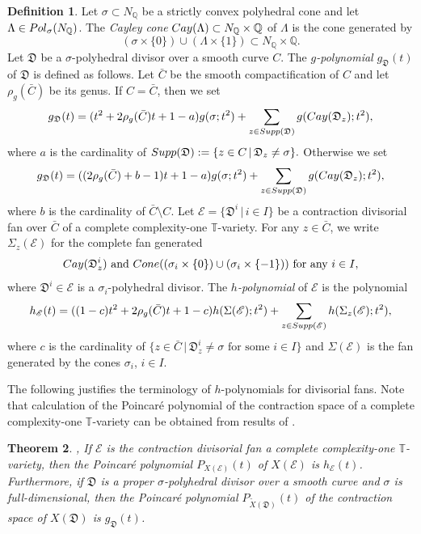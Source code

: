 \documentclass[11pt, reqno]{amsart}
\theoremstyle{plain}
\newtheorem{theorem}{Theorem}[section]
\theoremstyle{definition}
\newtheorem{definition}[theorem]{Definition}
\theoremstyle{remark}
\begin{document}
\begin{definition}
Let $\sigma\subset N_{\mathbb{Q}}$ be a strictly convex polyhedral cone and let $\Lambda\in {\rm Pol}_{\sigma}(N_{\mathbb{Q}})$. The \emph{Cayley cone} ${\rm Cay}(\Lambda)\subset N_{\mathbb{Q}}\times \mathbb{Q}$  of $\Lambda$ is the cone generated by
$$(\sigma\times\{0\})\cup(\Lambda\times\{1\})\subset N_{\mathbb{Q}}\times \mathbb{Q}.$$
Let $\mathfrak{D}$ be a $\sigma$-polyhedral divisor over a smooth curve $C$. The \emph{$g$-polynomial} $g_{\mathfrak{D}}(t)$ 
of $\mathfrak{D}$ is defined as 
follows. Let $\bar{C}$ be the smooth compactification of $C$ and let $\rho_{g}(\bar{C})$ be its genus. If $C = \bar{C}$, then we set
$$g_{\mathfrak{D}}(t) =  (t^{2} + 2\rho_{g}(\bar{C})t  + 1-a)g(\sigma; t^{2}) + \sum_{z\in {\rm Supp}(\mathfrak{D})}g({\rm Cay}(\mathfrak{D}_{z}); t^{2}),$$
where $a$ is the cardinality of 
${\rm Supp}(\mathfrak{D}):=\{z\in C\,|\, \mathfrak{D}_{z}\neq \sigma\}.$ Otherwise we set 
$$g_{\mathfrak{D}}(t) =  ((2\rho_{g}(\bar{C}) + b -1)t  + 1-a)g(\sigma; t^{2}) + \sum_{z\in {\rm Supp}(\mathfrak{D})}g({\rm Cay}(\mathfrak{D}_{z}); t^{2}),$$
where $b$ is the cardinality of $\bar{C}\setminus C$. Let $\mathscr{E} =  \{\mathfrak{D}^{i}\,|\, i\in I\}$ be
a contraction divisorial fan over $\bar{C}$ of a complete complexity-one $\mathbb{T}$-variety. For any $z\in\bar{C}$, we write $\Sigma_{z}(\mathscr{E})$ for the complete fan generated  
$${\rm Cay}(\mathfrak{D}_{z}^{i})\text{ and } {\rm Cone}((\sigma_{i}\times\{0\})\cup(\sigma_{i}\times\{-1\})) \text{ for any }i\in I,$$ where $\mathfrak{D}^{i}\in\mathscr{E}$ is a $\sigma_{i}$-polyhedral divisor. The \emph{$h$-polynomial} of $\mathscr{E}$
is the polynomial 
$$h_{\mathscr{E}}(t) =  ((1-c)t^{2} + 2\rho_{g}(\bar{C})t + 1-c)h(\Sigma(\mathscr{E});t^{2}) + \sum_{z\in{\rm Supp}(\mathscr{E})}h(\Sigma_{z}(\mathscr{E}); t^{2}),$$
where $c$ is the cardinality of 
$\{z\in \bar{C}\,|\, \mathfrak{D}_{z}^{i}\neq \sigma\text{ for some }i\in I\}$
and $\Sigma(\mathscr{E})$ is the fan generated by the cones $\sigma_{i}$, $i\in I$.
\end{definition}
The following justifies the terminology of $h$-polynomials for divisorial fans. Note that calculation of the Poincar\'e polynomial of the contraction space of a complete complexity-one $\mathbb{T}$-variety can be obtained from results of \cite{CMS08}. 
\begin{theorem}\cite[Theorem 1.1]{AL18}, \cite[Theorem 5.1, Lemma 5.17]{AL21}\label{theo-gpol-dib} If $\mathscr{E}$ is the contraction divisorial fan 
a complete complexity-one $\mathbb{T}$-variety, then the Poincar\'e polynomial $P_{X(\mathscr{E})}(t)$ of $X(\mathscr{E})$ is $h_{\mathscr{E}}(t)$. Furthermore, if $\mathfrak{D}$ is a proper $\sigma$-polyhedral divisor over a smooth curve and $\sigma$ is full-dimensional, then the Poincar\'e polynomial $P_{\widetilde{X}(\mathfrak{D})}(t)$ of the contraction space of $X(\mathfrak{D})$ is  $g_{\mathfrak{D}}(t)$. 
\end{theorem}
\end{document}
